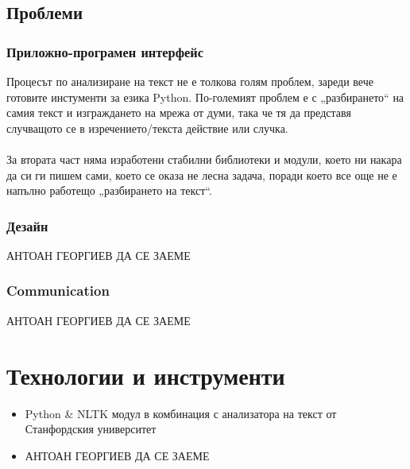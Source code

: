 \documentclass[a4paper, 12pt]{article}
\begin{document}
		\subsection{Проблеми}
			\subsubsection{Приложно-програмен интерфейс}
			    Процесът по анализиране на текст не е толкова голям проблем, зареди вече готовите инстументи за езика Python. По-големият проблем е с „разбирането“ на самия текст и изграждането на мрежа от думи, така че тя да представя случващото се в изречението/текста действие или случка. \\ \\
			    За втората част няма изработени стабилни библиотеки и модули, което ни накара да си ги пишем сами, което се оказа не лесна задача, поради което все още не е напълно работещо „разбирането на текст“.
			\subsubsection{Дезайн}
			    АНТОАН ГЕОРГИЕВ ДА СЕ ЗАЕМЕ
			\subsubsection{Communication}
				АНТОАН ГЕОРГИЕВ ДА СЕ ЗАЕМЕ
	\section{Технологии и инструменти}
	\begin{itemize}
		\item Python \& NLTK модул в комбинация с анализатора на текст от Станфордския университет
		\item АНТОАН ГЕОРГИЕВ ДА СЕ ЗАЕМЕ
	\end{itemize}
	\newpage
\end{document}
